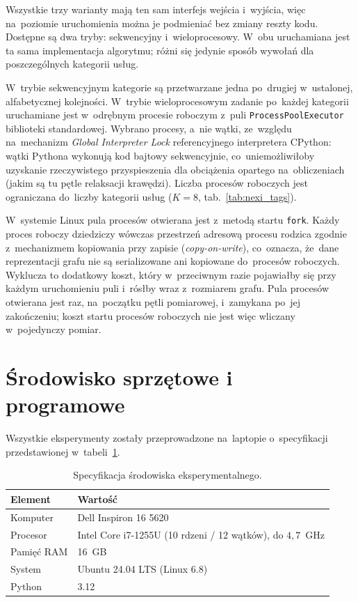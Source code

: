 Wszystkie trzy warianty mają ten sam interfejs wejścia i~wyjścia, więc na~poziomie
uruchomienia można je podmieniać bez zmiany reszty kodu. Dostępne są dwa tryby:
sekwencyjny i~wieloprocesowy. W~obu uruchamiana jest ta sama implementacja algorytmu;
różni się jedynie sposób wywołań dla poszczególnych kategorii usług.

W~trybie sekwencyjnym kategorie są przetwarzane jedna po~drugiej w~ustalonej, alfabetycznej
kolejności. W~trybie wieloprocesowym zadanie po~każdej kategorii uruchamiane jest w~odrębnym
procesie roboczym z~puli \texttt{ProcessPoolExecutor} biblioteki standardowej.
Wybrano procesy, a~nie wątki, ze~względu na~mechanizm \emph{Global Interpreter Lock}
referencyjnego interpretera CPython: wątki Pythona wykonują kod bajtowy sekwencyjnie,
co~uniemożliwiłoby uzyskanie rzeczywistego przyspieszenia dla obciążenia opartego
na~obliczeniach (jakim są tu pętle relaksacji krawędzi). Liczba procesów roboczych
jest ograniczana do~liczby kategorii usług ($K=8$, tab.~\ref{tab:nexi_tags}).

W~systemie Linux pula procesów otwierana jest z~metodą startu \texttt{fork}.
Każdy proces roboczy dziedziczy wówczas przestrzeń adresową procesu rodzica zgodnie
z~mechanizmem kopiowania przy zapisie (\emph{copy-on-write}), co~oznacza, że~dane
reprezentacji grafu nie są serializowane ani kopiowane do~procesów roboczych.
Wyklucza to dodatkowy koszt, który w~przeciwnym razie pojawiałby się przy każdym uruchomieniu
puli i~rósłby wraz z~rozmiarem grafu. Pula procesów otwierana jest raz,
na~początku pętli pomiarowej, i~zamykana po~jej zakończeniu; koszt startu procesów
roboczych nie jest więc wliczany w~pojedynczy pomiar.

\section{Środowisko sprzętowe i programowe}
\label{sec:impl:srodowisko}

Wszystkie eksperymenty zostały przeprowadzone na~laptopie
o~specyfikacji przedstawionej w~tabeli~\ref{tab:impl:srodowisko}.

\begin{table}[ht]
\centering
\caption{Specyfikacja środowiska eksperymentalnego.}
\label{tab:impl:srodowisko}
\begin{tabular}{l l}
\hline
\textbf{Element} & \textbf{Wartość} \\
\hline
Komputer       & Dell Inspiron 16 5620 \\
Procesor       & Intel Core i7-1255U (10 rdzeni / 12 wątków), do $4{,}7$~GHz \\
Pamięć RAM     & 16~GB \\
System         & Ubuntu 24.04 LTS (Linux 6.8) \\
Python         & 3.12 \\
\hline
\end{tabular}
\end{table}

